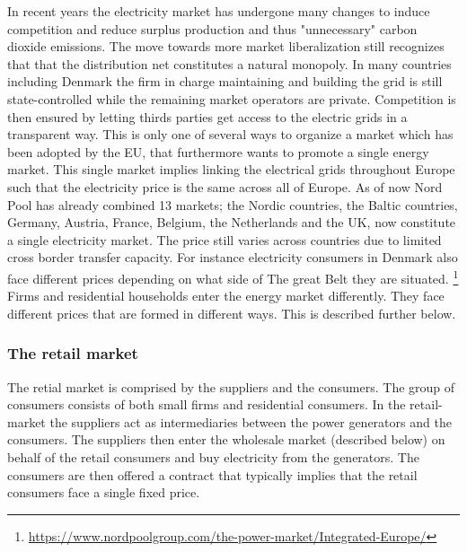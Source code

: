 In recent years the electricity market has undergone many changes to induce competition and reduce surplus production and thus "unnecessary" carbon dioxide emissions. The move towards more market liberalization still recognizes that that the distribution net constitutes a natural monopoly. In many countries including Denmark the firm in charge maintaining and building the grid is still state-controlled while the remaining market operators are private. Competition is then ensured by letting thirds parties get access to the electric grids in a transparent way. This is only one of several ways to organize a market which has been adopted by the EU, that furthermore wants to promote a single energy market. This single market  implies linking the electrical grids throughout Europe such that the electricity price is the same across all of Europe. As of now Nord Pool has already combined 13 markets; the Nordic countries, the Baltic countries, Germany, Austria, France, Belgium, the Netherlands and the UK, now constitute a single electricity market. The price still varies across countries due to limited cross border transfer capacity. For instance electricity consumers in Denmark also face different prices depending on what side of The great Belt they are situated. \footnote{\url{https://www.nordpoolgroup.com/the-power-market/Integrated-Europe/}} \smallskip \\

Firms and residential households enter the energy market differently. They face different prices that are formed in different ways. This is described further below.

\subsubsection{The retail market}
\label{subsubsec: t_resmarket}
The retial market is comprised by the suppliers and the consumers. The group of consumers consists of both small firms and residential consumers. In the retail-market the suppliers act as intermediaries between the power generators and the consumers. The suppliers then enter the wholesale market (described below) on behalf of the retail consumers and buy electricity from the generators. The consumers are then offered a contract that typically implies that the retail consumers face a single fixed price.\smallskip \\

